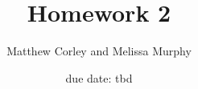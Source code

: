 
         \newcommand\alg[1]{\ensuremath{\mathbf{#1}}}
         \newcommand{\<}{\ensuremath{\langle}}
         \renewcommand{\>}{\ensuremath{\rangle}}
         \newcommand\fld[1]{\ensuremath{\mathbb{#1}}}
         \newcommand\Z{\fld{Z}}
         \newcommand\GF{\ensuremath{\operatorname{GF}}}
         \author{Matthew Corley and Melissa Murphy}
         \title{Homework 2}
         \date{due date: tbd}



\maketitle


